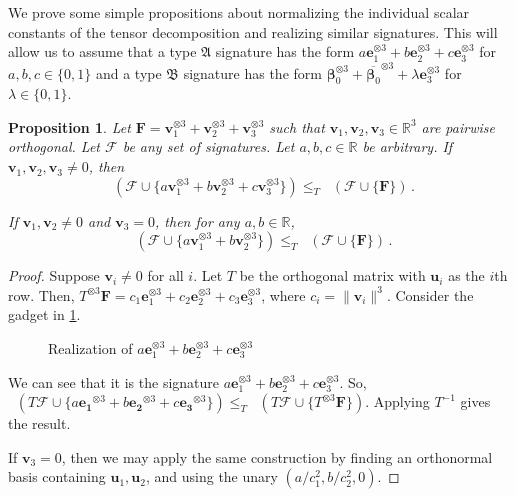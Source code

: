 \documentclass[11pt]{article}
\newtheorem{proposition}[theorem]{Proposition}
\DeclareMathOperator{\holts}{Holant^*_3}
\newcommand{\teh}{^{\otimes 3}}
\newcommand{\ternarytractgeneq}{$\mathfrak{A}$\xspace}
\newcommand{\ternarytractz}{$\mathfrak{B}$\xspace}
\begin{document}
We prove some simple propositions about normalizing the individual scalar constants of the tensor decomposition and realizing similar signatures. 
This will allow us to assume that a type \ternarytractgeneq signature has the form $a \mathbf{e}_1\teh + b \mathbf{e}_2 \teh + c \mathbf{e}_3\teh$ for $a, b, c \in \{0, 1\}$ and a type \ternarytractz signature has the form $\boldsymbol{\beta}_0\teh + \overline{\boldsymbol{\beta}_0}\teh + \lambda \mathbf{e}_3 \teh$ for $\lambda \in \{0, 1\}$.
\begin{proposition}\label{lem:geneq-normalization}
  Let $\mathbf{F} = \mathbf{v}_1\teh + \mathbf{v}_2 \teh + \mathbf{v}_3 \teh$ such that $\mathbf{v}_1, \mathbf{v}_2, \mathbf{v}_3 \in \mathbb{R}^3$ are pairwise orthogonal.
  Let $\mathcal{F}$ be any set of signatures.
  Let $a, b, c \in \mathbb{R}$ be arbitrary.
  If $\mathbf{v}_1, \mathbf{v}_2, \mathbf{v}_3 \ne 0$, then 
  \[
    \holts(\mathcal{F} \cup \{a \mathbf{v}_1\teh + b\mathbf{v}_2 \teh + c \mathbf{v}_3 \teh\}) \le_T \holts(\mathcal{F} \cup \{ \mathbf{F} \}) \, .
  \]

  If $\mathbf{v}_1, \mathbf{v}_2 \ne 0$ and $\mathbf{v}_3 = 0$, then for any $a, b \in \mathbb{R}$,
  \[
    \holts(\mathcal{F} \cup \{a \mathbf{v}_1\teh + b \mathbf{v}_2 \teh\}) \le_T \holts(\mathcal{F}  \cup \{ \mathbf{F} \}) \, .
  \]
\end{proposition}
\begin{proof}
  Suppose $\mathbf{v}_i \ne 0$ for all $i$.
  Let $T$ be the orthogonal matrix with $\mathbf{u}_i$ as the $i$th row.
  Then, $T \teh \mathbf{F} = c_1 \mathbf{e}_1 \teh + c_2 \mathbf{e}_2 \teh + c_3 \mathbf{e}_3 \teh$,
  where $c_i = \|\mathbf{v}_i\|^3$.
  Consider the gadget in \cref{fig:geneq-normalization}.
  \begin{figure}
    \centering
    \caption{Realization of $a \mathbf{e}_1\teh + b \mathbf{e}_2\teh + c \mathbf{e}_3\teh$} \label{fig:geneq-normalization}
  \end{figure}
  We can see that it is the signature $a\mathbf{e}_1\teh + b\mathbf{e}_2 \teh + c\mathbf{e}_3 \teh$.
  So, $\holts(T \mathcal{F} \cup \{a\mathbf{e_1}\teh + b\mathbf{e_2}\teh + c\mathbf{e_3}\teh\}) \le_T \holts(T \mathcal{F} \cup \{T \teh \mathbf{F}\})$.
  Applying $T^{-1}$ gives the result.

  If $\mathbf{v}_3 = 0$, then we may apply the same construction by finding an orthonormal basis containing $\mathbf{u}_1, \mathbf{u}_2$, and using the unary $(a/c_1^2, b/c_2^2, 0)$.
\end{proof}
\end{document}

